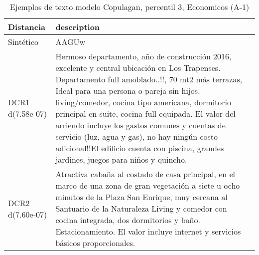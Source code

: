 \begin{table}[H]
\centering
\fontsize{10}{14}\selectfont
\caption{Ejemplos de texto modelo Copulagan, percentil 3, Economicos (A-1)}
\label{table-example-economicos-a-1-copulagan-3p-text}
\begin{tabular}{|l|m{35em}|}
\hline
\rowcolor[gray]{0.8}
Distancia & description \\
\hline Sintético & AAGUw \\
\hline DCR1 d(7.58e-07) & Hermoso departamento, a\~no de construcci\'on 2016, excelente y central ubicaci\'on en Los Trapenses. Departamento full amoblado..!!, 70 mt2 m\'as terrazas, Ideal para una persona o pareja sin hijos. living/comedor, cocina tipo americana, dormitorio principal en suite, cocina full equipada. El valor del arriendo incluye los gastos comunes y cuentas de servicio (luz, agua y gas), no hay ning\'un costo adicional!!El edificio cuenta con piscina, grandes jardines, juegos para ni\~nos y quincho. \\
\hline DCR2 d(7.60e-07) & Atractiva caba\~na al costado de casa principal, en el marco de una zona de gran vegetaci\'on a siete u ocho minutos de la Plaza San Enrique, muy cercana al Santuario de la Naturaleza
Living y comedor con cocina integrada, dos dormitorios y ba\~no. Estacionamiento.
El valor incluye internet y servicios b\'asicos proporcionales. \\
\hline
\end{tabular}
\end{table}
